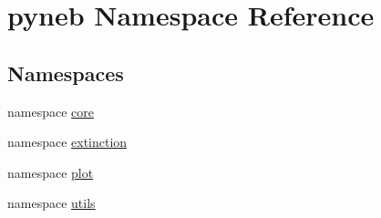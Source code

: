 \hypertarget{namespacepyneb}{\section{pyneb Namespace Reference}
\label{namespacepyneb}
}
\subsection*{Namespaces}
\begin{DoxyCompactItemize}
\item 
namespace \hyperlink{namespacepyneb_1_1core}{core}
\item 
namespace \hyperlink{namespacepyneb_1_1extinction}{extinction}
\item 
namespace \hyperlink{namespacepyneb_1_1plot}{plot}
\item 
namespace \hyperlink{namespacepyneb_1_1utils}{utils}
\end{DoxyCompactItemize}
